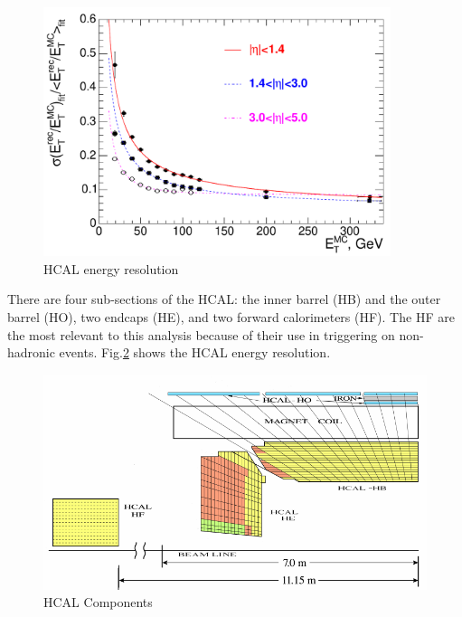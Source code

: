 \begin{figure}[h!]
\begin{centering}
\includegraphics[width=4in]{Chapter3/importfigs/Figure_001-008.pdf}
\par\end{centering}
\caption{HCAL energy resolution \label{fig:hcalRes}}
\end{figure}

There are four sub-sections of the HCAL: the inner barrel (HB) and the outer barrel (HO), two endcaps (HE), and two forward calorimeters (HF). The HF are the most relevant to this analysis because of their use in triggering on non-hadronic events. Fig.\ref{fig:hcalComp} shows the HCAL energy resolution.

\begin{figure}[h!]
\begin{centering}
\includegraphics[width=5in]{Chapter3/importfigs/filtering_noise_in_CMS_hadron_calorimeter.png}
\par\end{centering}
\caption{HCAL Components \label{fig:hcalComp}}
\end{figure}


